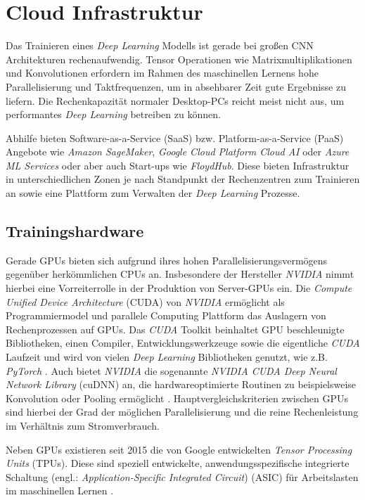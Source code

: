 \section{Cloud Infrastruktur} \label{cloud}

Das Trainieren eines \textit{Deep Learning} Modells ist gerade bei großen CNN Architekturen rechenaufwendig. Tensor Operationen wie Matrixmultiplikationen und Konvolutionen erfordern im Rahmen des maschinellen Lernens hohe Parallelisierung und Taktfrequenzen, um in absehbarer Zeit gute Ergebnisse zu liefern. Die Rechenkapazität normaler Desktop-PCs reicht meist nicht aus, um performantes \textit{Deep Learning} betreiben zu können. 

Abhilfe bieten Software-as-a-Service (SaaS) bzw. Platform-as-a-Service (PaaS) Angebote wie \textit{Amazon SageMaker}, \textit{Google Cloud Platform Cloud AI} oder \textit{Azure ML Services} oder aber auch Start-ups wie \textit{FloydHub}. Diese bieten Infrastruktur in unterschiedlichen Zonen je nach Standpunkt der Rechenzentren zum Trainieren an sowie eine Plattform zum Verwalten der \textit{Deep Learning} Prozesse. 

\subsection*{Trainingshardware}

Gerade GPUs bieten sich aufgrund ihres hohen Parallelisierungsvermögens gegenüber herkömmlichen CPUs an. Insbesondere der Hersteller \textit{NVIDIA} nimmt hierbei eine Vorreiterrolle in der Produktion von Server-GPUs ein. Die \textit{Compute Unified Device Architecture} (CUDA) von \textit{NVIDIA} ermöglicht als Programmiermodel und parallele Computing Plattform das Auslagern von Rechenprozessen auf GPUs. Das \textit{CUDA} Toolkit beinhaltet GPU beschleunigte Bibliotheken, einen Compiler, Entwicklungswerkzeuge sowie die eigentliche \textit{CUDA} Laufzeit und wird von vielen \textit{Deep Learning} Bibliotheken genutzt, wie z.B. \textit{PyTorch} \cite{NVIDIA.20200209, PyTorch.20200209}. Auch bietet \textit{NVIDIA} die sogenannte \textit{NVIDIA CUDA Deep Neural Network Library} (cuDNN) an, die hardwareoptimierte Routinen zu beispielsweise Konvolution oder Pooling ermöglicht \cite{NVIDIA.20200520}. Hauptvergleichskriterien zwischen GPUs sind hierbei der Grad der möglichen Parallelisierung und die reine Rechenleistung im Verhältnis zum Stromverbrauch.

Neben GPUs existieren seit 2015 die von Google entwickelten \textit{Tensor Processing Units} (TPUs). Diese sind speziell entwickelte, anwendungsspezifische integrierte Schaltung (engl.: \textit{Application-Specific Integrated Circuit}) (ASIC) für Arbeitslasten im maschinellen Lernen \cite{GoogleCloud.20200209b}.

